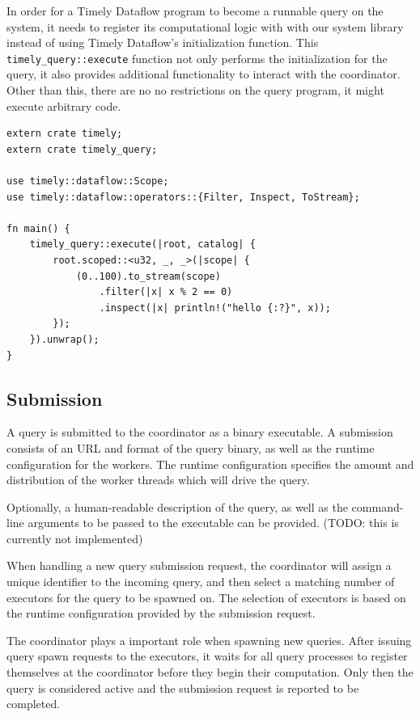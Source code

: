 In order for a Timely Dataflow program to become a runnable query on the system,
it needs to register its computational logic with with our system library instead of
using Timely Dataflow's initialization function. This
\lstinline{timely_query::execute} function not only performs the initialization
for the query, it also provides additional functionality to interact with the
coordinator. Other than this, there are no no restrictions on the query program,
it might execute arbitrary code.

\begin{lstlisting}[caption={[Example query.]Example query which creates a stream of integers,
filters out all odd numbers and then prints the rest.}]
extern crate timely;
extern crate timely_query;

use timely::dataflow::Scope;
use timely::dataflow::operators::{Filter, Inspect, ToStream};

fn main() {
    timely_query::execute(|root, catalog| {
        root.scoped::<u32, _, _>(|scope| {
            (0..100).to_stream(scope)
                .filter(|x| x % 2 == 0)
                .inspect(|x| println!("hello {:?}", x));
        });
    }).unwrap();
}
\end{lstlisting}

\subsection{Submission}

A query is submitted to the coordinator as a binary executable. A submission
consists of an URL and format of the query binary, as well as the runtime
configuration for the workers. The runtime configuration specifies the amount
and distribution of the worker threads which will drive the query.

Optionally, a human-readable description of the query,
as well as the command-line arguments to be passed to the executable can be
provided. (TODO: this is currently not implemented)

When handling a new query submission request, the coordinator will assign a
unique identifier to the incoming query, and then select a
matching number of executors for the query to be spawned on. The selection
of executors is based on the runtime configuration provided by the submission
request.

The coordinator plays a important role when spawning new queries. After
issuing query spawn requests to the executors, it waits for all query processes
to register themselves at the coordinator before they begin their computation.
Only then the query is considered active and the submission request
is reported to be completed.



